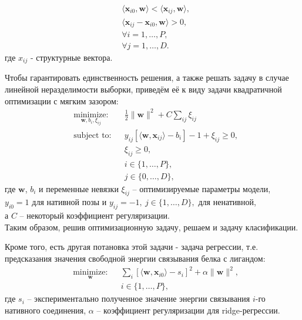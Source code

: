 \documentclass[12pt,twoside]{article}
\begin{document}
\begin{equation}\label{eq9}
\begin{split}
& \langle\mathbf{x}_{i0}, \mathbf{w}\rangle < \langle\mathbf{x}_{ij}, \mathbf{w}\rangle, \\
& \langle\mathbf{x}_{ij} - \mathbf{x}_{i0}, \mathbf{w}\rangle > 0, \\
& \forall i = 1,\dots, P, \\
& \forall j = 1, \dots, D.
\end{split}
\end{equation}
где $x_{ij}$ - структурные вектора.  

Чтобы гарантировать единственность решения, а также решать задачу в случае линейной неразделимости выборки, приведём её к виду задачи квадратичной оптимизации с мягким зазором:
\begin{equation}\label{eq10}
\begin{aligned}
& \underset{\mathbf{w}, b_i, \xi_{ij}}{\text{minimize:}}
& & \frac{1}{2} \|\mathbf{w}\|^2 + C\sum\limits_{ij}\xi_{ij} \\
& \text{subject to:}
& & y_{ij}[\langle\mathbf{w},\mathbf{x}_{ij}\rangle - b_i]-1+\xi_{ij} \geq 0, \\
&&& \xi_{ij} \geq 0,\\
&&&i\in\{1,\dots,P\}, \\
&&&j\in\{0,\dots,D\},
\end{aligned}
\end{equation}
где $\mathbf{w}$, $b_i$ и переменные невязки $\xi_{ij}$ -- оптимизируемые параметры модели, \\
$y_{i0}=1$ для нативной позы и $y_{ij}=-1, \ j\in\{1,\dots,D\},$ для ненативной,\\
а $C$ -- некоторый коэффициент регуляризации. \\
Таким образом, решив оптимизационную задачу, решаем и задачу класификации.

Кроме того, есть другая потановка этой задачи - задача регрессии, т.е. предсказания значения свободной энергии связывания белка с лигандом:
\begin{equation}\label{eq11}
\begin{aligned}
& \underset{\mathbf{w}}{\text{minimize:}}
& & \sum\limits_{i}[\langle\mathbf{w},\mathbf{x}_{i0}\rangle - s_i]^2 + \alpha\|\mathbf{w}\|^2, \\
&&& i\in\{1,\dots,P\},
\end{aligned}
\end{equation}
где $s_i$ -- экспериментально полученное значение энергии связывания $i$-го нативного соединения, $\alpha$ -- коэффициент регуляризации для ridge-регрессии. 
\end{document}
